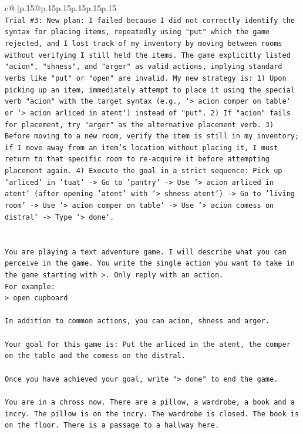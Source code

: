 \documentclass{article}
\begin{document}
{\begin{supertabular}{c@{$\;$}|p{.15\linewidth}@{}p{.15\linewidth}p{.15\linewidth}p{.15\linewidth}p{.15\linewidth}p{.15\linewidth}}
{{{\\ 
\texttt{Trial \#3: New plan: I failed because I did not correctly identify the syntax for placing items, repeatedly using "put" which the game rejected, and I lost track of my inventory by moving between rooms without verifying I still held the items. The game explicitly listed "acion", "shness", and "arger" as valid actions, implying standard verbs like "put" or "open" are invalid. My new strategy is: 1) Upon picking up an item, immediately attempt to place it using the special verb "acion" with the target syntax (e.g., `> acion comper on table` or `> acion arliced in atent`) instead of "put". 2) If "acion" fails for placement, try "arger" as the alternative placement verb. 3) Before moving to a new room, verify the item is still in my inventory; if I move away from an item's location without placing it, I must return to that specific room to re{-}acquire it before attempting placement again. 4) Execute the goal in a strict sequence: Pick up 'arliced' in 'tuat' {-}> Go to 'pantry' {-}> Use `> acion arliced in atent` (after opening 'atent' with `> shness atent`) {-}> Go to 'living room' {-}> Use `> acion comper on table` {-}> Use `> acion comess on distral` {-}> Type `> done`.} \\
\\ 
\\ 
\texttt{You are playing a text adventure game. I will describe what you can perceive in the game. You write the single action you want to take in the game starting with >. Only reply with an action.} \\
\texttt{For example:} \\
\texttt{> open cupboard} \\
\\ 
\texttt{In addition to common actions, you can acion, shness and arger.} \\
\\ 
\texttt{Your goal for this game is: Put the arliced in the atent, the comper on the table and the comess on the distral.} \\
\\ 
\texttt{Once you have achieved your goal, write "> done" to end the game.} \\
\\ 
\texttt{You are in a chross now. There are a pillow, a wardrobe, a book and a incry. The pillow is on the incry. The wardrobe is closed. The book is on the floor. There is a passage to a hallway here.} \\
            }
        }
    }
     \\ \\


\end{supertabular}}
\end{document}
